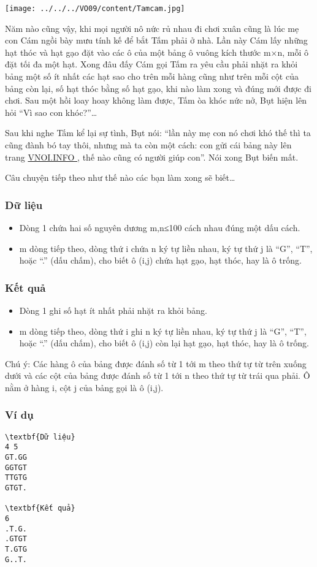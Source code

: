 






\texttt{[image: ../../../VO09/content/Tamcam.jpg]}

       Năm nào cũng vậy, khi mọi người nô nức rủ nhau đi chơi xuân cũng là lúc mẹ con Cám ngồi bày mưu tính kế để bắt Tấm phải ở nhà. Lần này Cám lấy những hạt thóc và hạt gạo đặt vào các ô của một bảng ô vuông kích thước m×n, mỗi ô đặt tối đa một hạt. Xong đâu đấy Cám gọi Tấm ra yêu cầu phải nhặt ra khỏi bảng một số ít nhất các hạt sao cho trên mỗi hàng cũng như trên mỗi cột của bảng còn lại, số hạt thóc bằng số hạt gạo, khi nào làm xong và đúng mới được đi chơi. Sau một hồi loay hoay không làm được, Tấm òa khóc nức nở, Bụt hiện lên hỏi “Vì sao con khóc?”…      

       Sau khi nghe Tấm kể lại sự tình, Bụt nói: “lần này mẹ con nó chơi khó thế thì ta cũng đành bó tay thôi, nhưng mà ta còn một cách: con gửi cái bảng này lên trang       \href{http://vnoi.info/}{        VNOI.INFO       }       , thế nào cũng có người giúp con”. Nói xong Bụt biến mất.      

       Câu chuyện tiếp theo như thế nào các bạn làm xong sẽ biết…      

\subsubsection{   Dữ liệu  }
\begin{itemize}
	\item     Dòng 1 chứa hai số nguyên dương m,n≤100 cách nhau đúng một dấu cách.   
	\item     m dòng tiếp theo, dòng thứ i chứa n ký tự liền nhau, ký tự thứ j là “G”, “T”, hoặc “.” (dấu chấm), cho biết ô (i,j) chứa hạt gạo, hạt thóc, hay là ô trống.   
\end{itemize}

\subsubsection{   Kết quả  }
\begin{itemize}
	\item     Dòng 1 ghi số hạt ít nhất phải nhặt ra khỏi bảng.   
	\item     m dòng tiếp theo, dòng thứ i ghi n ký tự liền nhau, ký tự thứ j là “G”, “T”, hoặc “.” (dấu chấm), cho biết ô (i,j) còn lại hạt gạo, hạt thóc, hay là ô trống.   
\end{itemize}

   Chú ý: Các hàng ô của bảng được đánh số từ 1 tới m theo thứ tự từ trên xuống dưới và các cột của bảng được đánh số từ 1 tới n theo thứ tự từ trái qua phải. Ô nằm ở hàng i, cột j của bảng gọi là ô (i,j).  

\subsubsection{   Ví dụ  }
\begin{verbatim}
\textbf{Dữ liệu}
4 5
GT.GG
GGTGT
TTGTG
GTGT.	

\textbf{Kết quả}
6
.T.G.
.GTGT
T.GTG
G..T.
\end{verbatim}

